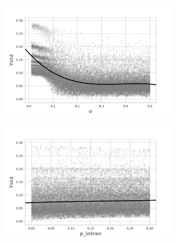 \begin{figure}[H]
                \begin{subfigure}[b]{0.49\textwidth}
            \includegraphics[width=\textwidth]{ims/nlregressions/nlregressionmutatingosigma.png}
          \end{subfigure}
                \begin{subfigure}[b]{0.49\textwidth}
            \includegraphics[width=\textwidth]{ims/nlregressions/nlregressionmutatingop_intran.png}
    \end{subfigure}
    
    \label{fig:scatter2}
  \end{figure}


